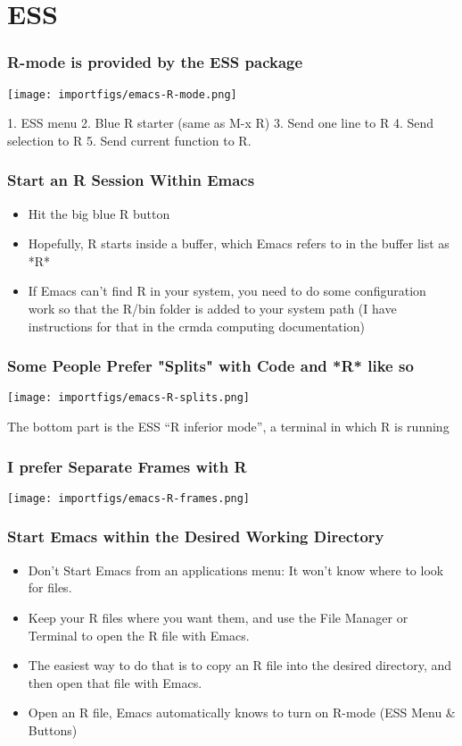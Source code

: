 \documentclass[11pt,english]{beamer}
\begin{document}
\section{ESS}

\begin{frame}[containsverbatim]
  \frametitle{R-mode is provided by the ESS package}

  \texttt{[image: importfigs/emacs-R-mode.png]}

  1. ESS menu 2. Blue R starter (same as M-x R) 3. Send one line to
  R 4. Send selection to R 5. Send current function to R. 

\end{frame}

\begin{frame}[containsverbatim]
  \frametitle{Start an R Session Within Emacs}
  \begin{itemize}
  \item Hit the big blue R button
  \item Hopefully, R starts inside a buffer, which Emacs refers to in the
    buffer list as {*}R{*}
  \item If Emacs can't find R in your system, you need to do some configuration
    work so that the R/bin folder is added to your system path (I have
    instructions for that in the crmda computing documentation)
  \end{itemize}
\end{frame}

\begin{frame}[containsverbatim]
  \frametitle{Some People Prefer "Splits" with Code and *R* like so}

  \texttt{[image: importfigs/emacs-R-splits.png]}

  The bottom part is the ESS ``R inferior mode'', a terminal in which
  R is running

\end{frame}

\begin{frame}[containsverbatim]
  \frametitle{I prefer Separate Frames with R}

  \texttt{[image: importfigs/emacs-R-frames.png]}

\end{frame}

\begin{frame}[containsverbatim]
  \frametitle{Start Emacs within the Desired Working Directory}
  \begin{itemize}
  \item Don't Start Emacs from an applications menu: It won't know where to
    look for files.
  \item Keep your R files where you want them, and use the File
    Manager or Terminal to open the R file with Emacs.
  \item The easiest way to do that is to copy an R file into the
    desired directory, and then open that file with Emacs. 
  \item Open an R file, Emacs automatically knows to turn on R-mode (ESS Menu
    \& Buttons)
  \end{itemize}
\end{frame}
\end{document}
